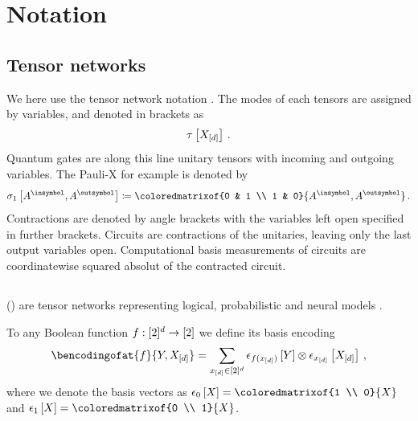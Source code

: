 \section{Notation}

\subsection{Tensor networks}

We here use the tensor network notation \cite{goessmann_tensor_2026}.
The modes of each tensors are assigned by variables, and denoted in brackets as
\begin{align*}
    \tau\left[X_{[d]}\right] \, .
\end{align*}
Quantum gates are along this line unitary tensors with incoming and outgoing variables.
The Pauli-X for example is denoted by
\begin{align*}
    \paulixat{\cavariable{\insymbol},\cavariable{\outsymbol}} \coloneqq
    \coloredmatrixof{0 & 1 \\ 1 & 0}{\cavariable{\insymbol},\cavariable{\outsymbol}} \, .
\end{align*}
Contractions are denoted by angle brackets with the variables left open specified in further brackets.
Circuits are contractions of the unitaries, leaving only the last output variables open.
Computational basis measurements of circuits are coordinatewise squared absolut of the contracted circuit.

\subsection{\ComputationActivationNetworks{}}

\ComputationActivationNetworks{} (\CompActNets{}) are tensor networks representing logical, probabilistic and neural models \cite{goessmann_tensor_2026}.

To any Boolean function $f:[2]^{d}\rightarrow[2]$ we define its basis encoding
\begin{align*}
    \bencodingofat{\formula}{\headvariable,\shortcatvariables}
    = \sum_{\shortcatindices\in[2]^{\catorder}} \onehotmapofat{\formula(\shortcatindices)}{\headvariable} \otimes \onehotmapofat{\shortcatindices}{\shortcatvariables}\, ,
\end{align*}
where we denote the basis vectors as $\fbasisat{\catvariable}=\coloredmatrixof{1 \\ 0}{\catvariable}$ and $\tbasisat{\catvariable}=\coloredmatrixof{0 \\ 1}{\catvariable}$.

